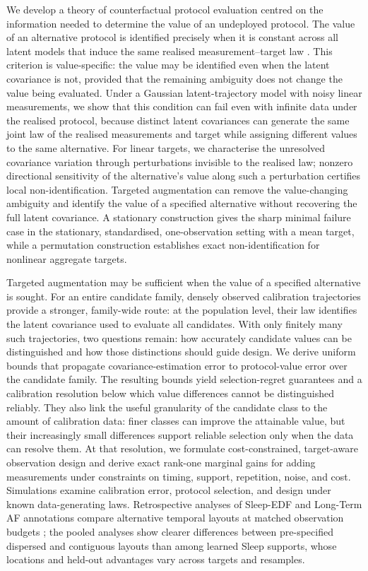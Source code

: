 We develop a theory of counterfactual protocol evaluation centred on the information needed to determine the value of an undeployed protocol. The value of an alternative protocol is identified precisely when it is constant across all latent models that induce the same realised measurement--target law \citep{koopmans1950identification,rothenberg1971identification}. This criterion is value-specific: the value may be identified even when the latent covariance is not, provided that the remaining ambiguity does not change the value being evaluated. Under a Gaussian latent-trajectory model with noisy linear measurements, we show that this condition can fail even with infinite data under the realised protocol, because distinct latent covariances can generate the same joint law of the realised measurements and target while assigning different values to the same alternative. For linear targets, we characterise the unresolved covariance variation through perturbations invisible to the realised law; nonzero directional sensitivity of the alternative's value along such a perturbation certifies local non-identification. Targeted augmentation can remove the value-changing ambiguity and identify the value of a specified alternative without recovering the full latent covariance. A stationary construction gives the sharp minimal failure case in the stationary, standardised, one-observation setting with a mean target, while a permutation construction establishes exact non-identification for nonlinear aggregate targets.


Targeted augmentation may be sufficient when the value of a specified alternative is sought. For an entire candidate family, densely observed calibration trajectories provide a stronger, family-wide route: at the population level, their law identifies the latent covariance used to evaluate all candidates. With only finitely many such trajectories, two questions remain: how accurately candidate values can be distinguished and how those distinctions should guide design. We derive uniform bounds that propagate covariance-estimation error to protocol-value error over the candidate family. The resulting bounds yield selection-regret guarantees and a calibration resolution below which value differences cannot be distinguished reliably. They also link the useful granularity of the candidate class to the amount of calibration data: finer classes can improve the attainable value, but their increasingly small differences support reliable selection only when the data can resolve them. At that resolution, we formulate cost-constrained, target-aware observation design and derive exact rank-one marginal gains for adding measurements under constraints on timing, support, repetition, noise, and cost. Simulations examine calibration error, protocol selection, and design under known data-generating laws. Retrospective analyses of Sleep-EDF and Long-Term AF annotations compare alternative temporal layouts at matched observation budgets \citep{kemp2000analysis,mourtazaev1995age,goldberger2000physiobank,petrutiu2007abrupt}; the pooled analyses show clearer differences between pre-specified dispersed and contiguous layouts than among learned Sleep supports, whose locations and held-out advantages vary across targets and resamples.


